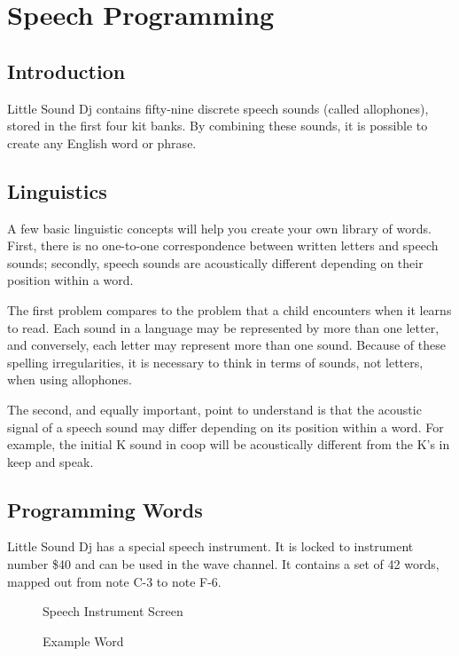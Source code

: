 \chapter{Speech Programming}
\label{speech-chapter}

\section{Introduction}

Little Sound Dj contains fifty-nine discrete speech sounds (called allophones), stored in the first four kit banks. By combining these sounds, it is possible to create any English word or phrase.

\section{Linguistics}

A few basic linguistic concepts will help you create your own library of words. First, there is no one-to-one correspondence between written letters and speech sounds; secondly, speech sounds are acoustically different depending on their position within a word.

The first problem compares to the problem that a child encounters when it learns to read. Each sound in a language may be represented by more than one letter, and conversely, each letter may represent more than one sound. Because of these spelling irregularities, it is necessary to think in terms of sounds, not letters, when using allophones.

The second, and equally important, point to understand is that the acoustic signal of a speech sound may differ depending on its position within a word. For example, the initial K sound in coop will be acoustically different from the K's in keep and speak.

\section{Programming Words}

Little Sound Dj has a special speech instrument. It is locked to instrument number \$40 and can be used in the wave channel. It contains a set of 42 words, mapped out from note C-3 to note F-6. 

\begin{figure}[htpb]
	\begin{center}
	\end{center}
	\caption{Speech Instrument Screen}
	\label{fig:speech}
\end{figure}
\begin{figure}[htpb]
	\begin{center}
	\end{center}
	\caption{Example Word}
	\label{fig:word}
\end{figure}

